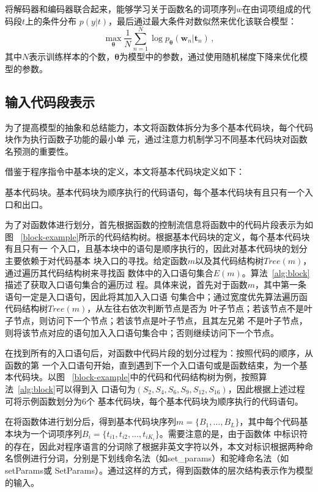将解码器和编码器联合起来，能够学习关于函数名的词项序列$w$在由词项组成的代码段$t$上的条件分布
$p(y|t)$，最后通过最大条件对数似然来优化该联合模型：
\begin{equation}
\max \limits_{\bm\theta} \frac{1}{N}\sum_{n=1}^{N} \log p_{\bm\theta}(\bm w_n | 
\bm t_n) \,,
\label{eq:loss}
\end{equation}
其中$N$表示训练样本的个数，$\bm\theta$为模型中的参数，通过使用随机梯度下降来优化模型的参数。

\subsection{输入代码段表示}
\label{represent}
为了提高模型的抽象和总结能力，本文将函数体拆分为多个基本代码块，每个代码块作为执行函数子功能的最小单
元，通过注意力机制学习不同基本代码块对函数名预测的重要性。

借鉴于程序指令中基本块的定义，本文将基本代码块定义如下：
\begin{Definition}
    基本代码块。基本代码块为顺序执行的代码语句，每个基本代码块有且只有一个入口和出口。
\end{Definition}

为了对函数体进行划分，首先根据函数的控制流信息将函数中的代码片段表示为如图
~\ref{block-example}所示的代码结构树。根据基本代码块的定义，每个基本代码块有且只有一
个入口，且基本块中的语句是顺序执行的，因此对基本代码块的划分主要依赖于对代码基本
块入口的寻找。给定函数$m$以及其代码结构树$Tree(m)$，通过遍历其代码结构树来寻找函
数体中的入口语句集合$E(m)$。算法~\ref{alg:block}描述了获取入口语句集合的遍历过
程。具体来说，首先对于函数$m$，其中第一条语句一定是入口语句，因此将其加入入口语
句集合中；通过宽度优先算法遍历函代码结构树$Tree(m)$，从左往右依次判断节点是否为
叶子节点；若该节点不是叶子节点，则访问下一个节点；若该节点是叶子节点，且其左兄弟
不是叶子节点，则将该节点对应的语句加入入口语句集合中；否则继续访问下一个节点。

在找到所有的入口语句后，对函数中代码片段的划分过程为：按照代码的顺序，从函数的第
一个入口语句开始，直到遇到下一个入口语句或是函数结束，为一个基本代码块。以图
~\ref{block-example}中的代码和代码结构树为例，按照算法~\ref{alg:block}可以得到入
口语句为$(S_2,S_4,S_6,S_9,S_{12},S_{16})$，因此根据上述过程可将示例函数划分为6个
基本代码块，每个基本代码块为顺序执行的代码语句。

在将函数体进行划分后，得到基本代码块序列$m=\{B_1, \dots, B_L\}$，其中每个代码基
本块为一个词项序列$B_i=\{t_{i1},t_{i2},\dots,t_{iK_i}\}$。需要注意的是，由于函数体
中标识符的存在，因此对程序语言的分词除了根据非英文字符以外，本文对标识根据两种命
名惯例进行分词，分别是下划线命名法（如set\_params）和驼峰命名法（如setParams或
SetParams）。通过这样的方式，得到函数体的层次结构表示作为模型的输入。

